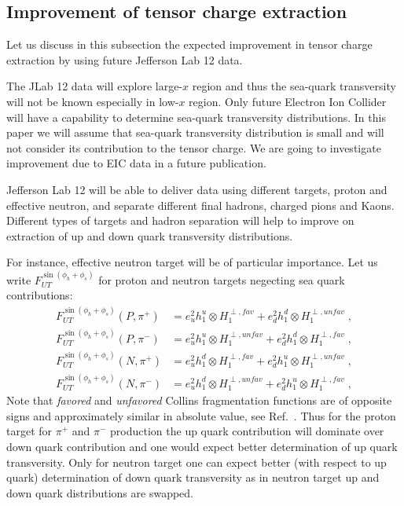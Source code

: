 \documentclass[twocolumn,showpacs,preprintnumbers,amsmath,amssymb,floatfix,prd]{revtex4}
\begin{document}
\subsection{Improvement of tensor charge extraction}
%
Let us discuss in this subsection the expected improvement in tensor charge extraction by using future Jefferson Lab 12 data.

The JLab 12 data will explore large-$x$ region and thus the sea-quark transversity will not be
known especially in low-$x$ region. Only future Electron Ion Collider will have a capability to determine sea-quark transversity distributions.  In this paper we will assume that sea-quark transversity distribution is small and will not consider its contribution to the tensor charge. We are going to investigate improvement due to EIC data in a future publication.

Jefferson Lab 12 will be able to deliver data using different targets, proton and effective neutron, and separate different final hadrons, charged pions and Kaons. Different types of targets and hadron separation will help to improve on extraction of up and down quark transversity distributions.

For instance, effective neutron target will be of particular importance. Let us write
$F_{UT}^{\sin\left(\phi_h +\phi_s\right)}$ for proton and neutron targets negecting sea quark contributions:
\begin{align}
F_{UT}^{\sin\left(\phi_h +\phi_s\right)}(P,\pi^+) &= e_u^2 h_1^{u} \otimes H_1^{\perp, fav} +
e_d^2 h_1^{d} \otimes H_1^{\perp, unfav}\; , \\
F_{UT}^{\sin\left(\phi_h +\phi_s\right)}(P,\pi^-) &= e_u^2 h_1^{u} \otimes H_1^{\perp, unfav} +
e_d^2 h_1^{d} \otimes H_1^{\perp, fav}\; ,\\
F_{UT}^{\sin\left(\phi_h +\phi_s\right)}(N,\pi^+) &= e_u^2 h_1^{d} \otimes H_1^{\perp, fav} +
e_d^2 h_1^{u} \otimes H_1^{\perp, unfav}\; ,\\
F_{UT}^{\sin\left(\phi_h +\phi_s\right)}(N,\pi^-) &= e_u^2 h_1^{d} \otimes H_1^{\perp, unfav} +
e_d^2 h_1^{u} \otimes H_1^{\perp, fav}\; ,
\end{align}
Note that {\em favored} and  {\em unfavored} Collins fragmentation functions are of opposite signs and approximately similar in absolute value, see Ref.~\cite{Kang:2015msa,Anselmino:2013vqa}. Thus for the proton target for $\pi^+$ and $\pi^-$ production the up quark contribution will dominate over down quark contribution and one would expect better determination of up quark transversity.
Only for neutron target one can expect better (with respect to up quark) determination of down quark transversity as in neutron target up and down quark distributions are swapped.
\end{document}
